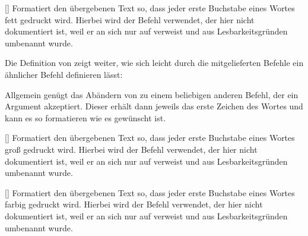 %
%
%

[]
Formatiert den übergebenen Text so, dass jeder erste Buchstabe eines Wortes fett gedruckt wird. Hierbei wird der Befehl  verwendet, der hier nicht dokumentiert ist, weil er an sich nur auf  verweist und aus Lesbarkeitsgründen umbenannt wurde.
\begin{latex*}
\end{latex*}
Die Definition von  zeigt weiter, wie sich leicht durch die mitgelieferten Befehle ein ähnlicher Befehl definieren lässt:
Allgemein genügt das Abändern von  zu einem beliebigen anderen Befehl, der ein Argument akzeptiert. Dieser erhält dann jeweils das erste Zeichen des Wortes und kann es so formatieren wie es gewünscht ist.

%
%
%

[]
Formatiert den übergebenen Text so, dass jeder erste Buchstabe eines Wortes groß gedruckt wird. Hierbei wird der Befehl  verwendet, der hier nicht dokumentiert ist, weil er an sich nur auf  verweist und aus Lesbarkeitsgründen umbenannt wurde.
\begin{latex*}
\end{latex*}

%
%
%

[]
Formatiert den übergebenen Text so, dass jeder erste Buchstabe eines Wortes farbig gedruckt wird. Hierbei wird der Befehl  verwendet, der hier nicht dokumentiert ist, weil er an sich nur auf  verweist und aus Lesbarkeitsgründen umbenannt wurde.
\begin{latex*}
\end{latex*}

